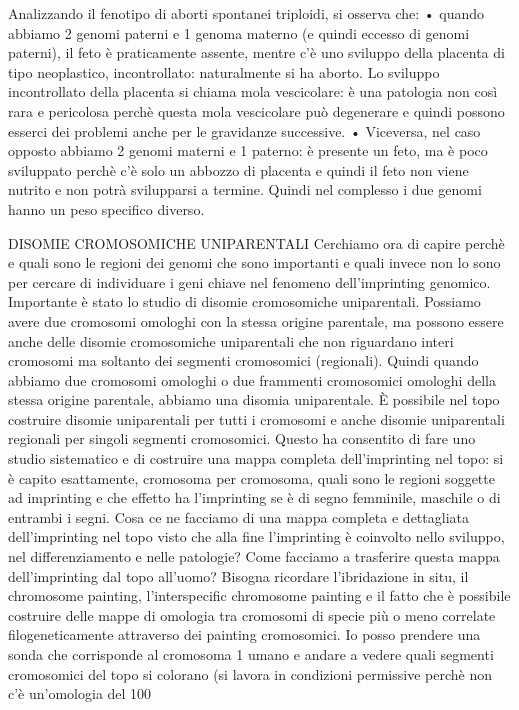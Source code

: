 \documentclass[11pt]{book}
\begin{document}
Analizzando il fenotipo di aborti spontanei triploidi, si osserva che:
    • quando abbiamo 2 genomi paterni e 1 genoma materno (e quindi eccesso di genomi paterni), il feto è praticamente assente, mentre c’è uno sviluppo della placenta di tipo neoplastico, incontrollato: naturalmente si ha aborto. Lo sviluppo incontrollato della placenta si chiama mola vescicolare: è una patologia non così rara e pericolosa perchè questa mola vescicolare può degenerare e quindi possono esserci dei problemi anche per le gravidanze successive.
    • Viceversa, nel caso opposto abbiamo 2 genomi materni e 1 paterno: è presente un feto, ma è poco sviluppato perchè c’è solo un abbozzo di placenta e quindi il feto non viene nutrito e non potrà svilupparsi a termine.
Quindi nel complesso i due genomi hanno un peso specifico diverso. 

DISOMIE CROMOSOMICHE UNIPARENTALI
Cerchiamo ora di capire perchè e quali sono le regioni dei genomi che sono importanti e quali invece non lo sono per cercare di individuare i geni chiave nel fenomeno dell’imprinting genomico.
Importante è stato lo studio di disomie cromosomiche uniparentali. Possiamo avere due cromosomi omologhi con la stessa origine parentale, ma possono essere anche delle disomie cromosomiche uniparentali che non riguardano interi cromosomi ma soltanto dei segmenti cromosomici (regionali). 
Quindi quando abbiamo due cromosomi omologhi o due frammenti cromosomici omologhi della stessa origine parentale, abbiamo una disomia uniparentale.
È possibile nel topo costruire disomie uniparentali per tutti i cromosomi e anche disomie uniparentali regionali per singoli segmenti cromosomici. Questo ha consentito di fare uno studio sistematico e di costruire una mappa completa dell’imprinting nel topo: si è capito esattamente, cromosoma per cromosoma, quali sono le regioni soggette ad imprinting e che effetto ha l’imprinting se è di segno femminile, maschile o di entrambi i segni.
Cosa ce ne facciamo di una mappa completa e dettagliata dell’imprinting nel topo visto che alla fine l’imprinting è coinvolto nello sviluppo, nel differenziamento e nelle patologie? Come facciamo a trasferire questa mappa dell’imprinting dal topo all’uomo? Bisogna ricordare l’ibridazione in situ, il chromosome painting, l’interspecific chromosome painting e il fatto che è possibile costruire delle mappe di omologia tra cromosomi di specie più o meno correlate filogeneticamente attraverso dei painting cromosomici. Io posso prendere una sonda che corrisponde al cromosoma 1 umano e andare a vedere quali segmenti cromosomici del topo si colorano (si lavora in condizioni permissive perchè non c’è un’omologia del 100%
\end{document}
